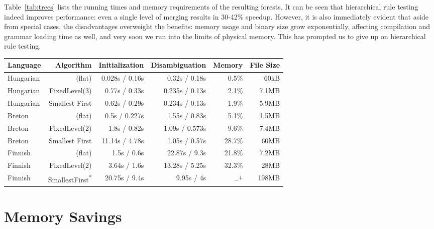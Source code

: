 \documentclass[11pt]{article}
\begin{document}
Table~\ref{tab:trees} lists the running times and memory requirements of the
resulting forests. It can be seen that hierarchical rule testing
indeed improves performance: even a single level of merging results in 30-42\%
speedup. However, it is also immediately evident that aside from special cases,
the disadvantages overweight the benefits: memory usage and binary size grow
exponentially, affecting compilation and grammar loading time as well, and very
soon we run into the limits of physical memory. This has prompted us to give up
on hierarchical rule testing.

\begin{table*}[h]
  \centering
  \caption{Performance and storage requirements of rule testing trees}
  \label{tab:trees}
  \begin{tabular}{ | l | r | r | r | r | r | }
  \hline
  \textbf{Language} & \textbf{Algorithm} & \textbf{Initialization} &
  \textbf{Disambiguation} & \textbf{Memory} & \textbf{File Size} \\
  \hline
  Hungarian & (flat) & 0.028s / 0.16s & 0.32s / 0.18s & 0.5\% & 60kB \\
  Hungarian & FixedLevel(3) & 0.77s / 0.33s & 0.235s / 0.13s & 2.1\% & 7.1MB \\
  Hungarian & Smallest First & 0.62s / 0.29s & 0.234s / 0.13s & 1.9\% & 5.9MB \\
  Breton    & (flat) & 0.5s / 0.227s & 1.55s / 0.83s & 5.1\% & 1.5MB \\
  Breton    & FixedLevel(2) & 1.8s / 0.82s & 1.09s / 0.573s & 9.6\% & 7.4MB \\
  Breton    & Smallest First & 11.14s / 4.78s & 1.05s / 0.57s & 28.7\% & 60MB \\
  Finnish   & (flat) & 1.5s / 0.6s & 22.87s / 9.3s & 21.8\% & 7.2MB \\
  Finnish   & FixedLevel(2) & 3.64s / 1.6s & 13.28s / 5.25s & 32.3\% & 28MB \\
  Finnish   & SmallestFirst\textsuperscript{*} & 20.75s / 9.4s & 9.95s / 4s & --\textsuperscript{+} & 198MB \\
  \hline
  \end{tabular}
\end{table*}

\section{Memory Savings}
\label{sec:memory}
\end{document}
